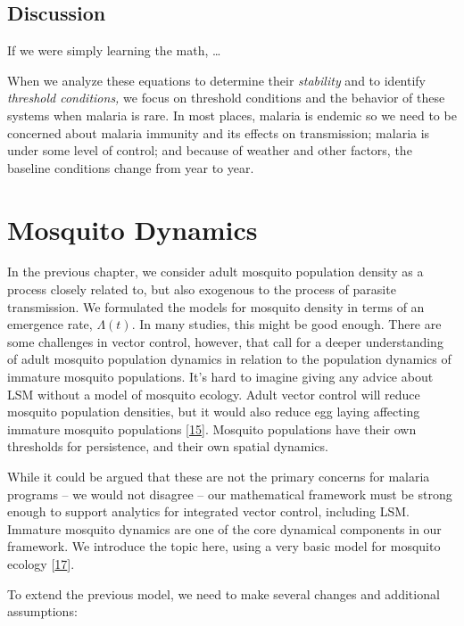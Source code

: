 \documentclass[
]{book}
\begin{document}
\hypertarget{discussion}{%
\section{Discussion}\label{discussion}}

If we were simply learning the math, \ldots{}

When we analyze these equations to determine their \emph{stability} and to identify \emph{threshold conditions,} we focus on threshold conditions and the behavior of these systems when malaria is rare. In most places, malaria is endemic so we need to be concerned about malaria immunity and its effects on transmission; malaria is under some level of control; and because of weather and other factors, the baseline conditions change from year to year.

\hypertarget{mosquito-dynamics}{%
\chapter{Mosquito Dynamics}\label{mosquito-dynamics}}

In the previous chapter, we consider adult mosquito population density as a process closely related to, but also exogenous to the process of parasite transmission. We formulated the models for mosquito density in terms of an emergence rate, \(\Lambda(t)\). In many studies, this might be good enough. There are some challenges in vector control, however, that call for a deeper understanding of adult mosquito population dynamics in relation to the population dynamics of immature mosquito populations. It's hard to imagine giving any advice about LSM without a model of mosquito ecology. Adult vector control will reduce mosquito population densities, but it would also reduce egg laying affecting immature mosquito populations {[}\protect\hyperlink{ref-BradyOJ2015AdultVector}{15}{]}. Mosquito populations have their own thresholds for persistence, and their own spatial dynamics.

While it could be argued that these are not the primary concerns for malaria programs -- we would not disagree -- our mathematical framework must be strong enough to support analytics for integrated vector control, including LSM. Immature mosquito dynamics are one of the core dynamical components in our framework. We introduce the topic here, using a very basic model for mosquito ecology {[}\protect\hyperlink{ref-SmithDL2013_LarvalDynamics}{17}{]}.

To extend the previous model, we need to make several changes and additional assumptions:
\end{document}
